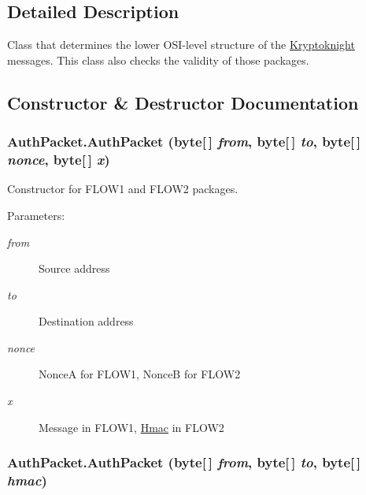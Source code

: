 \subsection{Detailed Description}
Class that determines the lower OSI-level structure of the \hyperlink{class_kryptoknight}{Kryptoknight} messages. This class also checks the validity of those packages. 



\subsection{Constructor \& Destructor Documentation}
\hypertarget{class_auth_packet_c0}{
\subsubsection[AuthPacket]{\setlength{\rightskip}{0pt plus 5cm}Auth\-Packet.Auth\-Packet (byte\mbox{[}$\,$\mbox{]} {\em from}, byte\mbox{[}$\,$\mbox{]} {\em to}, byte\mbox{[}$\,$\mbox{]} {\em nonce}, byte\mbox{[}$\,$\mbox{]} {\em x})}}
\label{class_auth_packet_c0}


Constructor for FLOW1 and FLOW2 packages. \begin{Desc}
\item[Parameters:]
\begin{description}
\item[{\em from}]Source address \item[{\em to}]Destination address \item[{\em nonce}]Nonce\-A for FLOW1, Nonce\-B for FLOW2 \item[{\em x}]Message in FLOW1, \hyperlink{class_hmac}{Hmac} in FLOW2 \end{description}
\end{Desc}
\hypertarget{class_auth_packet_c1}{
\subsubsection[AuthPacket]{\setlength{\rightskip}{0pt plus 5cm}Auth\-Packet.Auth\-Packet (byte\mbox{[}$\,$\mbox{]} {\em from}, byte\mbox{[}$\,$\mbox{]} {\em to}, byte\mbox{[}$\,$\mbox{]} {\em hmac})}}
\label{class_auth_packet_c1}


